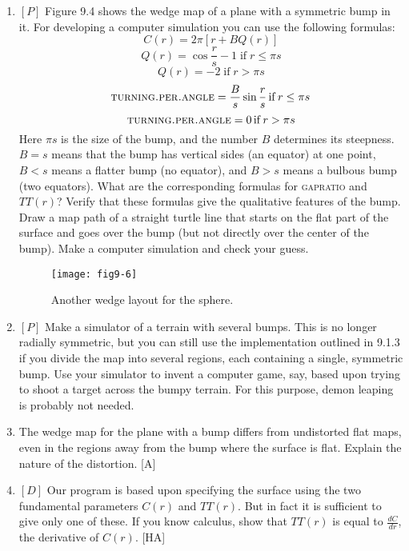 \documentclass{book}
\begin{document}
\begin{enumerate}
\item $[P]$ Figure 9.4 shows the wedge map of a plane with a symmetric bump
in it. For developing a computer simulation you can use the following
formulas:
$$ C(r) = 2 \pi [ r + BQ(r) ] $$
$$ Q(r) = \cos \frac {r} {s} - 1 \operatorname{if}  r \leq \pi s $$
$$ Q(r) = -2  \operatorname{if}  r > \pi s $$
$$\text{\textsc{turning}\textsc{.per}\textsc{.angle}} =  \frac {B} {s} \sin \frac {r} {s}  \operatorname{if}  r \le \pi s $$
$$\text{\textsc{turning}\textsc{.per}\textsc{.angle}} =  0  \operatorname{if}  r > \pi s $$
Here $ \pi s $ is the size of the bump, and the number $B$ determines its
steepness. $B = s$ means that the bump has vertical sides (an equator) at
one point, $B < s$ means a flatter bump (no equator), and $B > s$ means
a bulbous bump (two equators). What are the corresponding formulas
for \textsc{gapratio} and $TT(r)$? Verify that these formulas give the qualitative
features of the bump. Draw a map path of a straight turtle line that
starts on the flat part of the surface and goes over the bump (but not
directly over the center of the bump). Make a computer simulation and
check your guess.

\begin{figure}
\begin{center}
\texttt{[image: fig9-6]}
\caption{Another wedge layout for the sphere.}
\end{center}
\end{figure}


\item $[P]$ Make a simulator of a terrain with several bumps. This is no longer
radially symmetric, but you can still use the implementation outlined in
9.1.3 if you divide the map into several regions, each containing a single,
symmetric bump. Use your simulator to invent a computer game, say,
based upon trying to shoot a target across the bumpy terrain. For this
purpose, demon leaping is probably not needed.

\item The wedge map for the plane with a bump differs from undistorted
flat maps, even in the regions away from the bump where the surface is
flat. Explain the nature of the distortion. [A]

\item $[D]$ Our program is based upon specifying the surface using the two
fundamental parameters $C(r)$ and $TT(r)$. But in fact it is sufficient to
give only one of these. If you know calculus, show that $TT(r)$ is equal
to $\frac {dC} {dr}$, the derivative of $C(r)$. [HA]


\end{enumerate}
\end{document}
